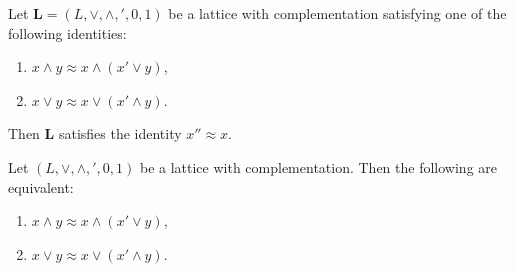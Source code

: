 \documentclass[10pt,a4paper]{amsart}
\begin{document}
\begin{lemma}\label{lem2}
Let $\mathbf L=(L,\vee,\wedge,{}',0,1)$ be a lattice with complementation satisfying one of the following identities:
\begin{enumerate}[{\rm(i)}]
\item $x\wedge y\approx x\wedge(x'\vee y)$,
\item $x\vee y\approx x\vee(x'\wedge y)$.
\end{enumerate}
Then $\mathbf L$ satisfies the identity $x''\approx x$.	
\end{lemma}

\begin{lemma}\label{lem3}
Let $(L,\vee,\wedge,{}',0,1)$ be a lattice with complementation. Then the following are equivalent:
\begin{enumerate}[{\rm(i)}]
\item $x\wedge y\approx x\wedge(x'\vee y)$,
\item $x\vee y\approx x\vee(x'\wedge y)$.
\end{enumerate}
\end{lemma}
\end{document}
